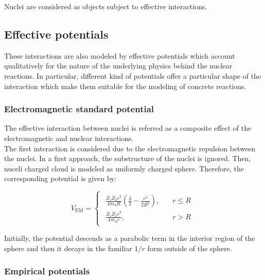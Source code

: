 \documentclass[openany]{book}
\begin{document}
Nuclei are considered as objects subject to effective interactions. 

\subsection{Effective potentials} \label{sub:potential_effective}

These interactions are also modeled by effective potentials which account qualitatively for the nature of the underlying physics behind the nuclear reactions. In particular, different kind of potentials offer a particular shape of the interaction which make them suitable for the modeling of concrete reactions.

\subsubsection{Electromagnetic standard potential} \label{sub:potential_effective_EM}

The effective interaction between nuclei is referred as a composite effect of the electromagnetic and nuclear interactions.  \\

The first interaction is considered due to the electromagnetic repulsion between the nuclei. In a first approach, the  substructure of the nuclei is ignored. Then, nuceli charged cloud is modeled as uniformly charged sphere. Therefore, the corresponding potential is given by:

\begin{equation} \label{eq:potential_EM}
	V_{\mathrm{EM}} = 	\left\{\begin{array}{l}
		\begin{split}
			\frac{Z_1Z_2e^2}{4\pi\epsilon_0R}\left(\frac{3}{2} - \frac{r^2}{2R^2}\right), \quad &r \le R \\ 
			\frac{Z_1Z_2e^2}{4\pi\epsilon_0r}, \quad &r > R	
		\end{split}
	\end{array}\right.
\end{equation}

Initially, the potential descends as a parabolic term in the interior region of the sphere and then it decays in the familiar $1/r$ form outside of the sphere. 

\subsubsection{Empirical potentials} \label{sub:potential_effective_empirical}
\end{document}
